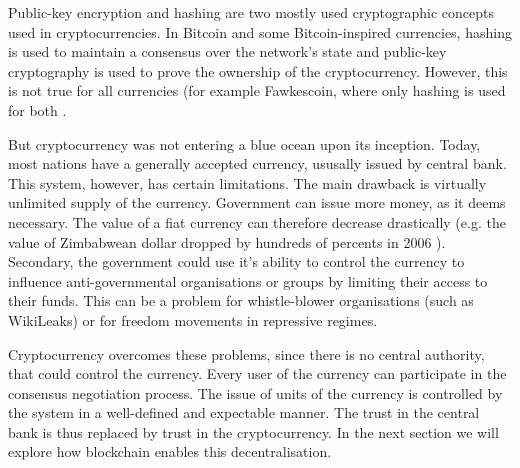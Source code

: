 Public-key encryption and hashing are two mostly used cryptographic concepts used in cryptocurrencies. In Bitcoin and some Bitcoin-inspired currencies, hashing is used to maintain a consensus over the network's state and public-key cryptography is used to prove the ownership of the cryptocurrency. However, this is not true for all currencies (for example Fawkescoin, where only hashing is used for both \cite{Bonneau2014FawkescoinCryptography}.

But cryptocurrency was not entering a blue ocean upon its inception. Today, most nations have a generally accepted currency, ususally issued by central bank. This system, however, has certain limitations. The main drawback is virtually unlimited supply of the currency. Government can issue more money, as it deems necessary. The value of a fiat currency can therefore decrease drastically (e.g. the value of Zimbabwean dollar dropped by hundreds of percents in 2006 \footnotemark ). Secondary, the government could use it's ability to control the currency to influence anti-governmental organisations or groups by limiting their access to their funds. This can be a problem for whistle-blower organisations (such as WikiLeaks) or for freedom movements in repressive regimes.
% 

Cryptocurrency overcomes these problems, since there is no central authority, that could control the currency. Every user of the currency can participate in the consensus negotiation process. The issue of units of the currency is controlled by the system in a well-defined and expectable manner. The trust in the central bank is thus replaced by trust in the cryptocurrency. In the next section we will explore how blockchain enables this decentralisation.